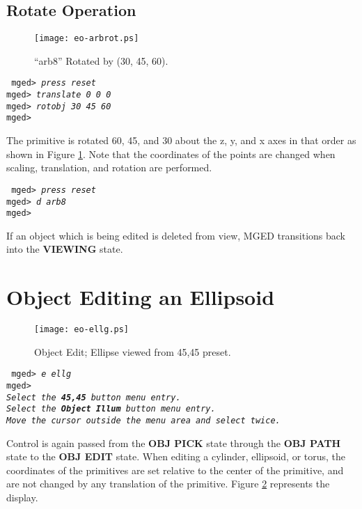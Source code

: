 \subsection{Rotate Operation}

\begin{figure}
\centering \texttt{[image: eo-arbrot.ps]}
\caption{``arb8'' Rotated by (30, 45, 60).}
\label{eo-arbrot}
\end{figure}

\noindent
{\tt
mged> {\em press reset}\\
mged> {\em translate 0 0 0}\\
mged> {\em rotobj 30 45 60}\\
mged>\\
}

The primitive is rotated 60, 45, and 30 about the z, y, and x axes in
that order as shown in Figure \ref{eo-arbrot}.
Note that the coordinates of the points are changed when scaling,
translation, and rotation are performed.

\noindent
{\tt
mged> {\em press reset}\\
mged> {\em d arb8}\\
mged>\\
}

If an object which is being edited is deleted from view, MGED transitions
back into the {\bf VIEWING} state.

\section{Object Editing an Ellipsoid}

\begin{figure}
\centering \texttt{[image: eo-ellg.ps]}
\caption{Object Edit; Ellipse viewed from 45,45 preset.}
\label{eo-ellg}
\end{figure}

\noindent
{\tt
mged> {\em e ellg}\\
mged>\\
{\em Select the {\bf 45,45} button menu entry.}\\
{\em Select the {\bf Object Illum} button menu entry.}\\
{\em Move the cursor outside the menu area and select twice.}\\
}

Control is again passed from the {\bf OBJ PICK} state through the
{\bf OBJ PATH} state to the {\bf OBJ EDIT} state.
When editing a cylinder, ellipsoid, or torus, the coordinates of the
primitives are set relative to the center of the primitive, and are not
changed by any translation of the primitive.  Figure \ref{eo-ellg}
represents the display.

